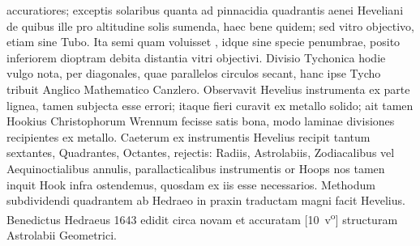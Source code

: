 \pend
\newpage
\pstart \noindent accuratiores; exceptis solaribus  quanta ad pinnacidia quadrantis\protect{} aenei Heveliani de quibus  ille pro altitudine solis sumenda, haec bene quidem; sed  vitro objectivo, etiam sine Tubo. Ita semi quam voluisset , idque sine specie penumbrae\protect{}, posito inferiorem dioptram\protect{} debita distantia vitri objectivi. Divisio Tychonica\protect{} hodie vulgo nota, per diagonales, quae parallelos circulos secant, hanc ipse Tycho\protect{} tribuit Anglico Mathematico Canzlero\protect{}. Observavit Hevelius\protect{} instrumenta ex parte lignea, tamen subjecta esse errori; itaque fieri curavit ex metallo solido; ait tamen Hookius\protect{} Christophorum Wrennum\protect{} fecisse satis bona, modo laminae divisiones recipientes ex metallo. Caeterum ex instrumentis Hevelius\protect{} recipit tantum sextantes\protect{}, Quadrantes\protect{}, Octantes, rejectis: Radiis, Astrolabiis, Zodiacalibus vel Aequinoctialibus annulis, parallacticalibus instrumentis or Hoops nos tamen inquit Hook\protect{} infra ostendemus, quosdam ex iis esse necessarios. Methodum subdividendi quadrantem\protect{} ab Hedraeo\protect{} in praxin traductam magni facit Hevelius\protect{}. Benedictus Hedraeus\protect{} 1643\cite{00330}  edidit circa novam et accuratam [10~v\textsuperscript{o}] structuram Astrolabii Geometrici.
\pend 